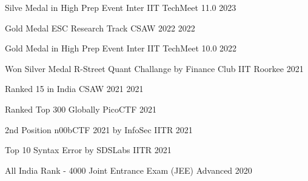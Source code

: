 


\begin{cvhonors}


\cvhonor
{Silve Medal in High Prep Event} %
{Inter IIT TechMeet 11.0}  %
{} %
{2023} %

\cvhonor
{Gold Medal ESC Research Track} %
{CSAW 2022}  %
{} %
{2022} %

\cvhonor
{Gold Medal in High Prep Event} %
{Inter IIT TechMeet 10.0}  %
{} %
{2022} %

  \cvhonor
{Won Silver Medal} %
{R-Street Quant Challange by Finance Club IIT Roorkee}  %
{} %
{2021} %

  \cvhonor
{Ranked 15 in India} %
{CSAW 2021}  %
{} %
{2021} %

  \cvhonor
{Ranked Top 300 Globally} %
{PicoCTF}  %
{} %
{2021} %


  \cvhonor
{2nd Position} %
{n00bCTF 2021 by InfoSec IITR}  %
{} %
{2021} %

  \cvhonor
{Top 10} %
{Syntax Error by SDSLabs IITR}  %
{} %
{2021} %

  \cvhonor
{All India Rank - 4000} %
{Joint Entrance Exam (JEE) Advanced }  %
{} %
{2020} %






	


\end{cvhonors}

